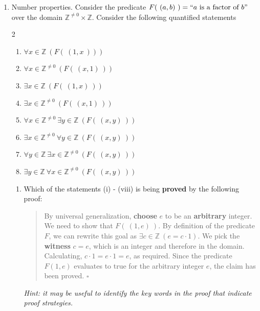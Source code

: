\documentclass[12pt, oneside]{article}
\begin{document}
\begin{enumerate}[labelindent=0pt, leftmargin=0pt]    
    
    \item Number properties. Consider the predicate  $F(~(a,b)~)  = ``a \text{ is a factor of } b"$ 
    over  the domain $\mathbb{Z}^{\neq 0} \times \mathbb{Z}$. Consider the following quantified
    statements
    \begin{multicols}{2}
    \begin{enumerate}[label=(\roman*)]
    \item $\forall x \in \mathbb{Z} ~(F(~(1,x~)))$
    \item $\forall x \in \mathbb{Z}^{\neq 0} ~(F(~(x,1)~))$
    \item $\exists x \in \mathbb{Z} ~(F(~(1,x)~))$
    \item $\exists x \in \mathbb{Z}^{\neq 0} ~(F(~(x,1)~))$
    \item $\forall x \in \mathbb{Z}^{\neq 0} ~\exists y \in \mathbb{Z} ~(F(~(x,y)~))$
    \item $\exists x \in \mathbb{Z}^{\neq 0} ~\forall y \in \mathbb{Z} ~(F(~(x,y)~))$
    \item $\forall y \in \mathbb{Z} ~\exists x \in \mathbb{Z}^{\neq 0} ~(F(~(x,y)~))$
    \item $\exists y \in \mathbb{Z} ~\forall x \in \mathbb{Z}^{\neq 0} ~(F(~(x,y)~))$
    \end{enumerate}
    \end{multicols}
    
    \begin{enumerate}
    
    \item
    Which of the statements (i) - (viii) is being {\bf proved} by the following proof:
    
    \begin{quote}
      By universal generalization, {\bf choose} $e$ to be an {\bf arbitrary} integer. 
      We need to show that $F(~(1,e)~)$. By definition of the  predicate $F$, we can rewrite 
      this goal as $\exists c \in \mathbb{Z}~(e = c \cdot 1)$. We pick the {\bf witness} $c = e$, 
      which is an integer and therefore in the domain. Calculating, 
      $c \cdot 1 = e \cdot 1 = e$, as required. Since the predicate $F(1,e)$ evaluates to true 
      for the arbitrary integer $e$, the claim has been proved. $\square$
    \end{quote}
    
    
    {\it Hint: it may be useful to 
    identify the key words in the proof that indicate proof strategies.}
    

\end{enumerate}
\end{enumerate}
\end{document}
